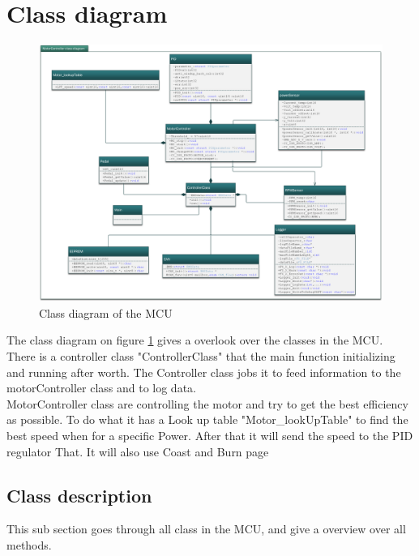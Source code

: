 \newpage
\section{Class diagram}
\label{sec:class_diagram}

\begin{figure}[H]
	\centering
	\includegraphics [width=6in]{Software/Pictures/class-diagram.png}
	\caption{Class diagram of the MCU}
	\label{fig:Class_diagram_MCU}
\end{figure}

The class diagram on figure \ref{fig:Class_diagram_MCU} gives a overlook over the classes in the MCU. There is a controller class "ControllerClass" that the main function initializing and running after worth. The Controller class jobs it to feed information to the motorController class and to log data.\\
MotorController class are controlling the motor and try to get the best efficiency as possible. To do what it has a Look up table "Motor\_lookUpTable" to find the best speed when for a specific Power. After that it will send the speed to the PID regulator That. It will also use Coast and Burn page \pageref{sec:Coast_and_Burn}\\

\subsection{Class description}

This sub section goes through all class in the MCU, and give a overview over all methods.

